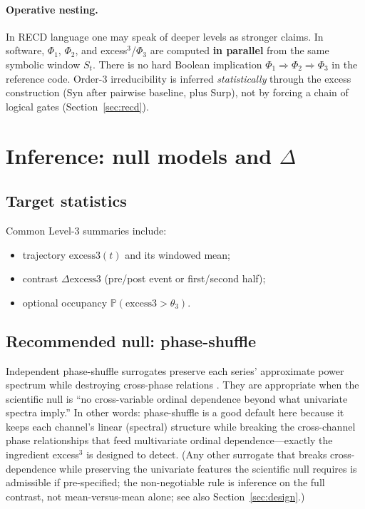 \documentclass[11pt,a4paper]{article}
\begin{document}
\paragraph{Operative nesting.}
In RECD language one may speak of deeper levels as stronger claims. In
software, $\Phi_1$, $\Phi_2$, and excess$^3$/$\Phi_3$ are computed
\textbf{in parallel} from the same symbolic window $S_t$. There is no hard
Boolean implication $\Phi_1\Rightarrow\Phi_2\Rightarrow\Phi_3$ in the
reference code. Order-3 irreducibility is inferred \emph{statistically}
through the excess construction (Syn after pairwise baseline, plus Surp),
not by forcing a chain of logical gates (Section~\ref{sec:recd}).

\section{Inference: null models and $\Delta$}
\label{sec:inference}

\subsection{Target statistics}

Common Level-3 summaries include:
\begin{itemize}[leftmargin=*,itemsep=2pt]
  \item trajectory $\mathrm{excess3}(t)$ and its windowed mean;
  \item contrast $\Delta\mathrm{excess3}$ (pre/post event or first/second half);
  \item optional occupancy $\mathbb{P}(\mathrm{excess3}>\theta_3)$.
\end{itemize}

\subsection{Recommended null: phase-shuffle}
\label{sec:phase_shuffle}

Independent phase-shuffle surrogates preserve each series' approximate
power spectrum while destroying cross-phase relations
\citep{Theiler1992}. They are appropriate when the scientific null is
``no cross-variable ordinal dependence beyond what univariate spectra
imply.'' In other words: phase-shuffle is a good default here because it
keeps each channel's linear (spectral) structure while breaking the
cross-channel phase relationships that feed multivariate ordinal
dependence---exactly the ingredient excess$^3$ is designed to detect.
(Any other surrogate that breaks cross-dependence while preserving the
univariate features the scientific null requires is admissible if
pre-specified; the non-negotiable rule is inference on the full contrast,
not mean-versus-mean alone; see also Section~\ref{sec:design}.)
\end{document}
